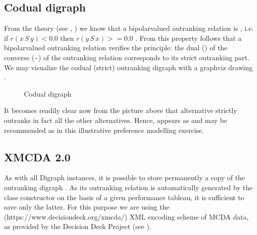 \documentclass[a4paper,10pt,english]{sphinxhowto}
\let\sphinxpxdimen\pdfpxdimen\else\newdimen\sphinxpxdimen
\begin{document}
\subsection{Codual digraph}
\label{\detokenize{tutorial:codual-digraph}}
From the theory (see ,  )  we know that a bipolar\sphinxhyphen{}valued outranking relation is , i.e. if \(r(x\,S\,y) < 0.0\) then \(r(y\,S\,x) >= 0.0\) . From this property follows that a bipolar\sphinxhyphen{}valued outranking relation verifies the  principle: the dual (\sphinxhyphen{}) of the converse (\textasciitilde{}) of the outranking relation corresponds to its strict outranking part. We may visualize the codual (strict) outranking digraph with a graphviz drawing \sphinxfootnotemark[1].

\begin{sphinxVerbatim}[commandchars=\\\{\},numbers=left,firstnumber=1,stepnumber=1]
\end{sphinxVerbatim}

\begin{figure}[htbp]
\centering
\capstart

\noindent\sphinxincludegraphics[width=300\sphinxpxdimen]{{codualOdg}.png}
\caption{Codual digraph}\label{\detokenize{tutorial:id116}}\end{figure}

It becomes readily clear now from the picture above that alternative  strictly outranks in fact all the other alternatives. Hence,  appears as  and may be recommended as  in this illustrative preference modelling exercise.


\subsection{XMCDA 2.0}
\label{\detokenize{tutorial:xmcda-2-0}}
As with all Digraph instances, it is possible to store permanently a copy of the outranking digraph . As its outranking relation is automatically generated by the  class constructor on the basis of a given performance tableau, it is sufficient to save only the latter. For this purpose we are using the  (https://www.decision\sphinxhyphen{}deck.org/xmcda/) XML encoding scheme of MCDA data, as provided by the Decision Deck Project (see ).
\end{document}
